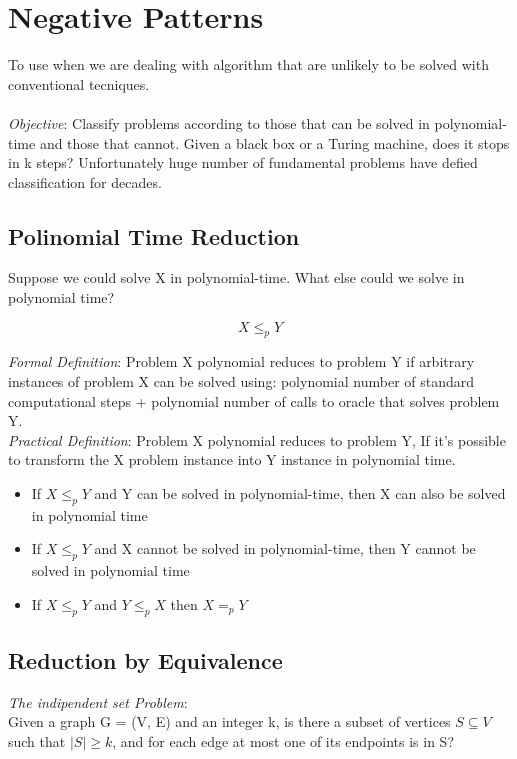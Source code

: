 \section{Negative Patterns}
To use when we are dealing with algorithm that are unlikely to be solved with conventional tecniques.\\\\
\emph{Objective}: Classify problems according to those that can be solved in polynomial-time and those that cannot. Given a black box or a Turing machine, does it stops in k steps? Unfortunately huge number of fundamental problems have defied classification for decades.

\subsection{Polinomial Time Reduction}
Suppose we could solve X in polynomial-time. What else could we solve in polynomial time?

\[ X \leq_{p} Y\]

\emph{Formal Definition}: Problem X polynomial reduces to problem Y if arbitrary instances of problem X can be solved using: polynomial number of standard computational steps + polynomial number of calls to oracle that solves problem Y.\\

\emph{Practical Definition}: Problem X polynomial reduces to problem Y, If it's possible to transform the X problem instance into Y instance in polynomial time.

\begin{itemize}
    \item{If $X \leq_{p} Y$ and Y can be solved in polynomial-time, then X can also be solved in polynomial time}
    \item{If $X \leq_{p} Y$ and X cannot be solved in polynomial-time, then Y cannot be solved in polynomial time}
    \item{If $X \leq_{p} Y$ and $Y \leq_{p} X$ then $X =_{p} Y$}
\end{itemize}

\subsection{Reduction by Equivalence}

\emph{The indipendent set Problem}:\\

Given a graph G = (V, E) and an integer k, is there a subset of vertices $S \subseteq V$ such that $|S| \geq k$, and for each edge at most one of its endpoints is in S?

